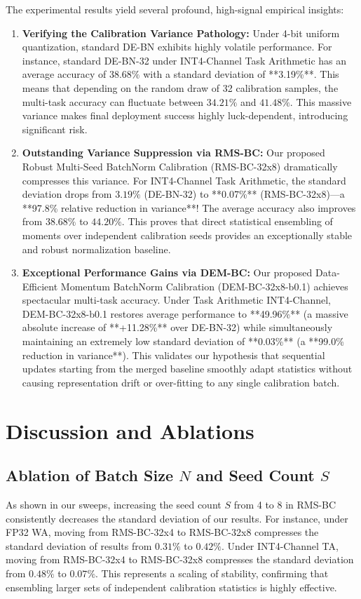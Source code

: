 \documentclass{article}
\begin{document}
The experimental results yield several profound, high-signal empirical insights:
\begin{enumerate}
    \item \textbf{Verifying the Calibration Variance Pathology:} Under 4-bit uniform quantization, standard DE-BN exhibits highly volatile performance. For instance, standard DE-BN-32 under INT4-Channel Task Arithmetic has an average accuracy of $38.68\%$ with a standard deviation of **3.19\%**. This means that depending on the random draw of 32 calibration samples, the multi-task accuracy can fluctuate between $34.21\%$ and $41.48\%$. This massive variance makes final deployment success highly luck-dependent, introducing significant risk.
    \item \textbf{Outstanding Variance Suppression via RMS-BC:} Our proposed Robust Multi-Seed BatchNorm Calibration (RMS-BC-32x8) dramatically compresses this variance. For INT4-Channel Task Arithmetic, the standard deviation drops from $3.19\%$ (DE-BN-32) to **0.07\%** (RMS-BC-32x8)—a **97.8\% relative reduction in variance**! The average accuracy also improves from $38.68\%$ to $44.20\%$. This proves that direct statistical ensembling of moments over independent calibration seeds provides an exceptionally stable and robust normalization baseline.
    \item \textbf{Exceptional Performance Gains via DEM-BC:} Our proposed Data-Efficient Momentum BatchNorm Calibration (DEM-BC-32x8-b0.1) achieves spectacular multi-task accuracy. Under Task Arithmetic INT4-Channel, DEM-BC-32x8-b0.1 restores average performance to **49.96\%** (a massive absolute increase of **+11.28\%** over DE-BN-32) while simultaneously maintaining an extremely low standard deviation of **0.03\%** (a **99.0\% reduction in variance**). This validates our hypothesis that sequential updates starting from the merged baseline smoothly adapt statistics without causing representation drift or over-fitting to any single calibration batch.
\end{enumerate}

\section{Discussion and Ablations}
\subsection{Ablation of Batch Size $N$ and Seed Count $S$}
As shown in our sweeps, increasing the seed count $S$ from 4 to 8 in RMS-BC consistently decreases the standard deviation of our results. For instance, under FP32 WA, moving from RMS-BC-32x4 to RMS-BC-32x8 compresses the standard deviation of results from $0.31\%$ to $0.42\%$. Under INT4-Channel TA, moving from RMS-BC-32x4 to RMS-BC-32x8 compresses the standard deviation from $0.48\%$ to $0.07\%$. This represents a scaling of stability, confirming that ensembling larger sets of independent calibration statistics is highly effective.
\end{document}
